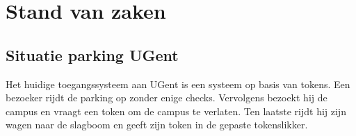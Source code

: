 \chapter{Stand van zaken}
\label{ch:stand-van-zaken}






\section{Situatie parking UGent}
Het huidige toegangssysteem aan UGent is een systeem op basis van tokens. Een bezoeker rijdt de parking op zonder enige checks. Vervolgens bezoekt hij de campus en vraagt een token om de campus te verlaten. Ten laatste rijdt hij zijn wagen naar de slagboom en geeft zijn token in de gepaste tokenslikker.

